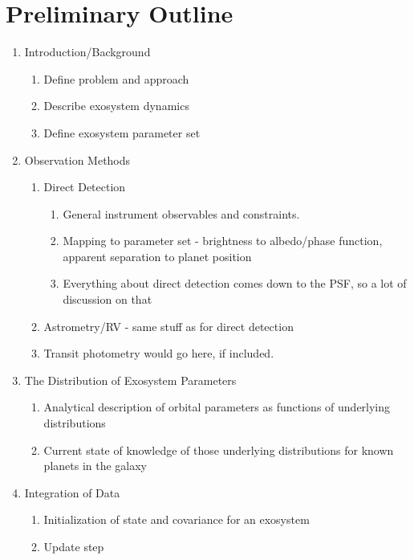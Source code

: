 \documentclass[oneside,11pt]{amsart}
\begin{document}
\section{Preliminary Outline}
\begin{enumerate}
\item Introduction/Background
\begin{enumerate}
\item Define problem and approach
\item Describe exosystem dynamics
\item Define exosystem parameter set
\end{enumerate}
\item Observation Methods
\begin{enumerate}
\item Direct Detection
\begin{enumerate}
\item General instrument observables and constraints.
\item Mapping to parameter set - brightness to albedo/phase function, apparent separation to planet position
\item Everything about direct detection comes down to the PSF, so a lot of discussion on that
\end{enumerate}
\item Astrometry/RV - same stuff as for direct detection
\item Transit photometry would go here, if included.
\end{enumerate}
\item The Distribution of Exosystem Parameters
\begin{enumerate}
\item Analytical description of orbital parameters as functions of underlying distributions
\item Current state of knowledge of those underlying distributions for known planets in the galaxy
\end{enumerate}
\item Integration of Data
\begin{enumerate}
\item Initialization of state and covariance for an exosystem
\item Update step
\end{enumerate}
\end{enumerate}
\end{document}
